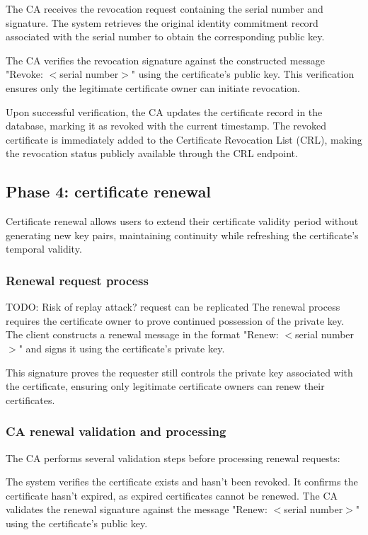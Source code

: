 The CA receives the revocation request containing the serial number and signature. 
The system retrieves the original identity commitment record associated with 
the serial number to obtain the corresponding public key.

The CA verifies the revocation signature against the constructed message 
"Revoke: $<$serial number$>$" using the certificate's public key. This verification 
ensures only the legitimate certificate owner can initiate revocation.

Upon successful verification, the CA updates the certificate record in the database, 
marking it as revoked with the current timestamp. The revoked certificate is 
immediately added to the Certificate Revocation List (CRL), making the revocation 
status publicly available through the CRL endpoint.

\subsection{Phase 4: certificate renewal}

Certificate renewal allows users to extend their certificate validity period 
without generating new key pairs, maintaining continuity while refreshing 
the certificate's temporal validity.

\subsubsection{Renewal request process}
{\color{red}TODO: Risk of replay attack? request can be replicated}
The renewal process requires the certificate owner to prove continued possession 
of the private key. The client constructs a renewal message in the format 
"Renew: $<$serial number$>$" and signs it using the certificate's private key.

This signature proves the requester still controls the private key associated 
with the certificate, ensuring only legitimate certificate owners can renew 
their certificates.

\subsubsection{CA renewal validation and processing}

The CA performs several validation steps before processing renewal requests:

The system verifies the certificate exists and hasn't been revoked. It confirms 
the certificate hasn't expired, as expired certificates cannot be renewed. 
The CA validates the renewal signature against the message "Renew: $<$serial number$>$" 
using the certificate's public key.

